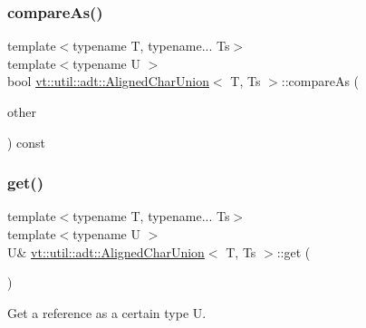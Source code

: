 \subsubsection{\texorpdfstring{compare\+As()}{compareAs()}}
{\footnotesize\ttfamily template$<$typename T, typename... Ts$>$ \\
template$<$typename U $>$ \\
bool \hyperlink{structvt_1_1util_1_1adt_1_1_aligned_char_union}{vt\+::util\+::adt\+::\+Aligned\+Char\+Union}$<$ T, Ts $>$\+::compare\+As (\begin{DoxyParamCaption}\item[{\hyperlink{structvt_1_1util_1_1adt_1_1_aligned_char_union}{Aligned\+Char\+Union}$<$ T, Ts $>$ const $\ast$}]{other }\end{DoxyParamCaption}) const\hspace{0.3cm}{\ttfamily [inline]}}

\mbox{\label{structvt_1_1util_1_1adt_1_1_aligned_char_union_acd5ebe14c0990b3edacf9aeea031499f}} 
\subsubsection{\texorpdfstring{get()}{get()}\hspace{0.1cm}{\footnotesize\ttfamily [1/2]}}
{\footnotesize\ttfamily template$<$typename T, typename... Ts$>$ \\
template$<$typename U $>$ \\
U\& \hyperlink{structvt_1_1util_1_1adt_1_1_aligned_char_union}{vt\+::util\+::adt\+::\+Aligned\+Char\+Union}$<$ T, Ts $>$\+::get (\begin{DoxyParamCaption}{ }\end{DoxyParamCaption})\hspace{0.3cm}{\ttfamily [inline]}}



Get a reference as a certain type {\ttfamily U}. 

\mbox{\label{structvt_1_1util_1_1adt_1_1_aligned_char_union_a4dfd0f51d2c58aa8af33e50e82fe98fa}} 
